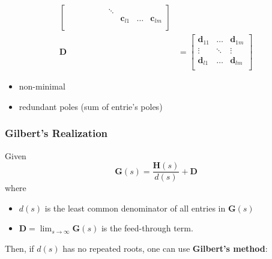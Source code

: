\begin{align*}
\begin{bmatrix}
                       &                 &                 &       &                 &       & \ddots &                 &       &                 \\
                       &                 &                 &       &                 &       &        & \mathbf{c}_{l1} & \dots & \mathbf{c}_{lm} \\
                  \end{bmatrix} \\
    \mathbf{D} & = \begin{bmatrix}
                       \mathbf{d}_{11} & \dots  & \mathbf{d}_{1m} \\
                       \vdots          & \ddots & \vdots          \\
                       \mathbf{d}_{l1} & \dots  & \mathbf{d}_{lm} \\
                   \end{bmatrix}
\end{align*}


\begin{itemize}
    \item non-minimal
    \item redundant poles (sum of entrie's poles)
\end{itemize}

\subsubsection{Gilbert's Realization}

Given
\begin{equation*}
    \mathbf{G}(s)=\frac{\mathbf{H}(s)}{d(s)}+\mathbf{D}
\end{equation*}
where
\begin{itemize}
    \item $d(s)$ is the least common denominator of all entries in $\mathbf{G}(s)$
    \item $\mathbf{D}=\lim_{s\to\infty}\mathbf{G}(s)$ is the feed-through term.
\end{itemize}

\newpar{}
Then, if $d(s)$ has no repeated roots, one can use \textbf{Gilbert's method}:

